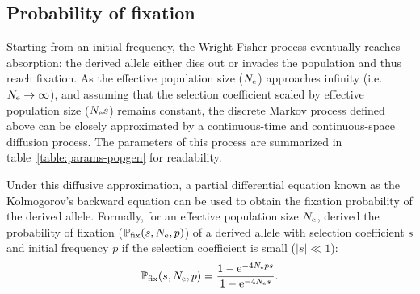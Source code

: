 \subsection{Probability of fixation}

Starting from an initial frequency, the Wright-Fisher process eventually reaches absorption: the derived \gls{allele} either dies out or invades the population and thus reach fixation.
As the \gls{effective population size} ($N_{\text{e}}$) approaches infinity (i.e.~$ N_{\text{e}} \to \infty$), and assuming that the selection coefficient scaled by \gls{effective population size} ($N_{\text{e}} s $) remains constant, the discrete Markov process defined above can be closely approximated by a continuous-time and continuous-space diffusion process.
The parameters of this process are summarized in table~\ref{table:params-popgen} for readability.

\begin{table}[htbp]
    \centering
    \noindent{}
    \caption[Parameters of population genetics]{Parameters of population genetics}\label{table:params-popgen}
\end{table}

Under this diffusive approximation, a partial differential equation known as the Kolmogorov's backward equation can be used to obtain the fixation probability of the derived \gls{allele}.
Formally, for an \gls{effective population size} $N_{\text{e}}$, \citet{Kimura1962} derived the probability of fixation ($\mathbb{P}_{\text{fix}}(s, N_{\text{e}}, p)$) of a derived \gls{allele} with selection coefficient $s$ and initial frequency $p$ if the selection coefficient is small ($|s| \ll 1$):
\begin{equation}
    \mathbb{P}_{\text{fix}}(s, N_{\text{e}}, p) = \dfrac{1 - \text{e}^{-4 N_{\text{e}} p s }}{1 - \text{e}^{-4 N_{\text{e}} s}}.
\end{equation}

